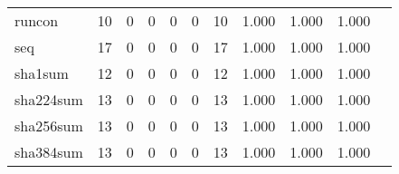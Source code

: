 \begin{longtable}{lp{1.20cm}p{1.20cm}p{1.20cm}p{1.20cm}p{1.20cm}p{1.20cm}p{1.20cm}p{1.20cm}p{1.20cm}p{1.20cm}}
runcon    &                                    10 &                                                  0 &                                                  0 &                                                  0 &                                                  0 &                                                 10 &                                         1.000 &                                              1.000 &                                              1.000 \\
seq       &                                    17 &                                                  0 &                                                  0 &                                                  0 &                                                  0 &                                                 17 &                                         1.000 &                                              1.000 &                                              1.000 \\
sha1sum   &                                    12 &                                                  0 &                                                  0 &                                                  0 &                                                  0 &                                                 12 &                                         1.000 &                                              1.000 &                                              1.000 \\
sha224sum &                                    13 &                                                  0 &                                                  0 &                                                  0 &                                                  0 &                                                 13 &                                         1.000 &                                              1.000 &                                              1.000 \\
sha256sum &                                    13 &                                                  0 &                                                  0 &                                                  0 &                                                  0 &                                                 13 &                                         1.000 &                                              1.000 &                                              1.000 \\
sha384sum &                                    13 &                                                  0 &                                                  0 &                                                  0 &                                                  0 &                                                 13 &                                         1.000 &                                              1.000 &                                              1.000 \\

\end{longtable}
